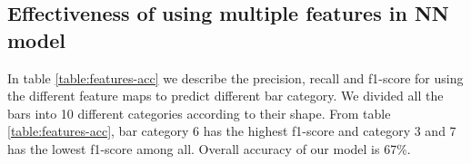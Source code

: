 \subsection{Effectiveness of using multiple features in NN model}

\begin{table}[htpb]
  \centering
  \vspace{0.3cm}
  \caption{Accuracy of using multiple features in NN model}
  \label{table:features-acc}
\end{table}

In table \ref{table:features-acc} we describe the precision, recall and f1-score for using the different feature maps to predict different bar category. We divided all the bars into 10 different categories according to their shape. From table \ref{table:features-acc}, bar category 6 has the highest f1-score and category 3 and 7 has the lowest f1-score among all. Overall accuracy of our model is 67\%.
